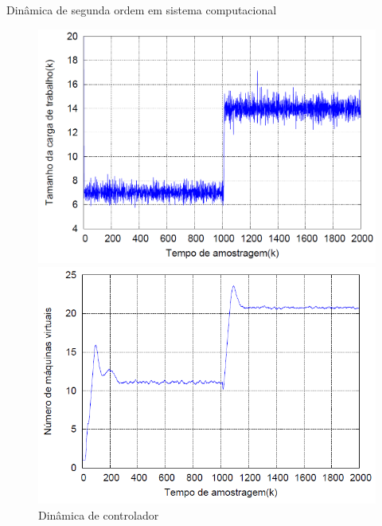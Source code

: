 \begin{frame}{Dinâmica de segunda ordem em sistema computacional}
	\begin{figure}
		\centering
		\begin{minipage}{.45\textwidth}
			\centering
			\includegraphics[scale=0.2]{images/entrada_resultado_helder_sys_segunda_orderm.png}	
		\end{minipage}
		\begin{minipage}{.45\textwidth}
			\centering
			\includegraphics[scale=0.29]{images/resultado_helder_sys_segunda_orderm.png}	
		\end{minipage}
		\caption{Dinâmica de controlador \cite{helder2014}}
	\end{figure}
\end{frame}

